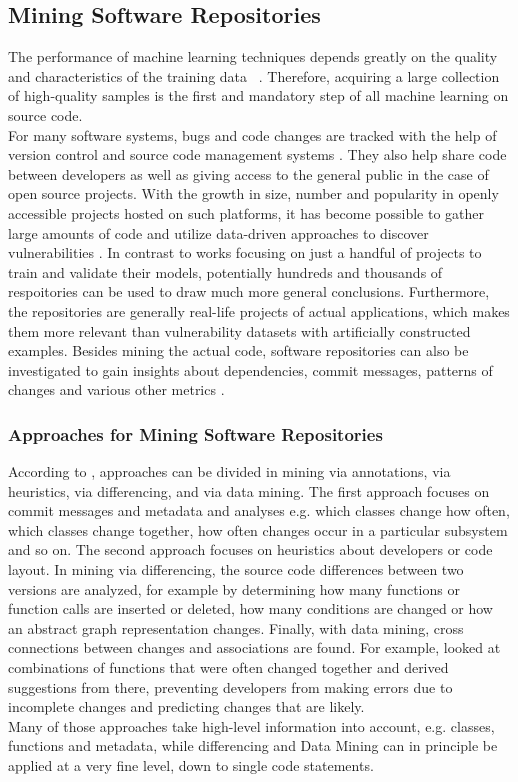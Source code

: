 \documentclass[
	a4paper,
	pagesize,
	pdftex,
	12pt,
	twoside, %
	BCOR=5mm, %
	ngerman,
	fleqn,
	final,
	]{scrartcl}
\begin{document}
\subsection{Mining Software Repositories}\label{Mining-Software-Repositories}
The performance of machine learning techniques depends greatly on the quality and characteristics of the training data ~\cite{Pang.2015}. Therefore, acquiring a large collection of high-quality samples is the first and mandatory step of all machine learning on source code.\\
For many software systems, bugs and code changes are tracked with the help of version control and source code management systems \cite{Zhou.2017}. They also help share code between developers as well as giving access to the general public in the case of open source projects. With the growth in size, number and popularity in openly accessible projects hosted on such platforms, it has become possible to gather large amounts of code and utilize data-driven approaches to discover vulnerabilities \cite{Russell.2018}. In contrast to works focusing on just a handful of projects to train and validate their models, potentially hundreds and thousands of respoitories can be used to draw much more general conclusions. Furthermore, the repositories are generally real-life projects of actual applications, which makes them more relevant than vulnerability datasets with artificially constructed examples. Besides mining the actual code, software repositories can also be investigated to gain insights about dependencies, commit messages, patterns of changes and various other metrics \citep{Liu.2018}.\\
\subsubsection{Approaches for Mining Software Repositories}
According to \cite{Kagdi.2005}, approaches can be divided in mining via annotations, via heuristics, via differencing, and via data mining. The first approach focuses on commit messages and metadata and analyses e.g. which classes change how often, which classes change together, how often changes occur in a particular subsystem and so on. The second approach focuses on heuristics about developers or code layout. In mining via differencing, the source code differences between two versions are analyzed, for example by determining how many functions or function calls are inserted or deleted, how many conditions are changed or how an abstract graph representation changes. Finally, with data mining, cross connections between changes and associations are found. For example, \cite{Zimmermann.2005} looked at combinations of functions that were often changed together and derived suggestions from there, preventing developers from making errors due to incomplete changes and predicting changes that are likely.\\
Many of those approaches take high-level information into account, e.g. classes, functions and metadata, while differencing and Data Mining can in principle be applied at a very fine level, down to single code statements.
\end{document}

